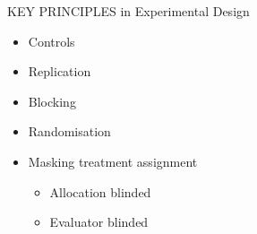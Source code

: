 \documentclass[10pt]{beamer}
\begin{document}
\begin{frame}{KEY PRINCIPLES in Experimental Design}

\begin{alertblock}{}
 \begin{itemize}
  \item Controls
  \item Replication
  \item Blocking
  \item Randomisation
  \item {\color{red}{Blinding}} Masking treatment assignment
    \begin{itemize}
     \item Allocation blinded
     \item Evaluator blinded
    \end{itemize}
 \end{itemize}

\end{alertblock}

\end{frame}
\end{document}
